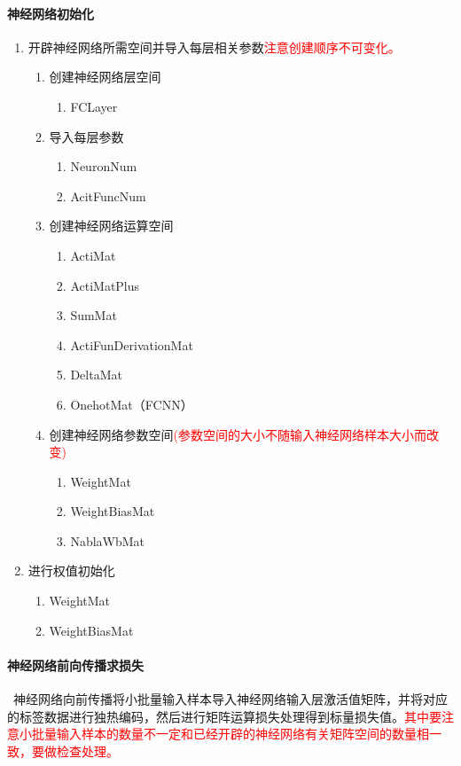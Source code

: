 \paragraph{神经网络初始化}
\begin{enumerate}
  \item 开辟神经网络所需空间并导入每层相关参数\textcolor{red}{注意创建顺序不可变化。}
  \begin{enumerate}[(1)]
    \item 创建神经网络层空间
    \begin{enumerate}[<1>]
      \item FCLayer
    \end{enumerate}
        \item 导入每层参数
    \begin{enumerate}[<1>]
      \item NeuronNum
      \item AcitFuncNum
    \end{enumerate}
    \item 创建神经网络运算空间
    \begin{enumerate}[<1>]
      \item ActiMat
      \item ActiMatPlus
      \item SumMat
      \item ActiFunDerivationMat
      \item DeltaMat
      \item OnehotMat（FCNN）
    \end{enumerate}
    \item 创建神经网络参数空间\textcolor{red}{(参数空间的大小不随输入神经网络样本大小而改变)}
    \begin{enumerate}[<1>]
      \item WeightMat
      \item WeightBiasMat
      \item NablaWbMat
    \end{enumerate}
  \end{enumerate}
  \item 进行权值初始化
  \begin{enumerate}
    \item WeightMat
    \item WeightBiasMat
  \end{enumerate}
\end{enumerate}



\paragraph{神经网络前向传播求损失} ~神经网络向前传播将小批量输入样本导入神经网络输入层激活值矩阵，并将对应的标签数据进行独热编码，然后进行矩阵运算损失处理得到标量损失值。\textcolor{red}{其中要注意小批量输入样本的数量不一定和已经开辟的神经网络有关矩阵空间的数量相一致，要做检查处理。}

